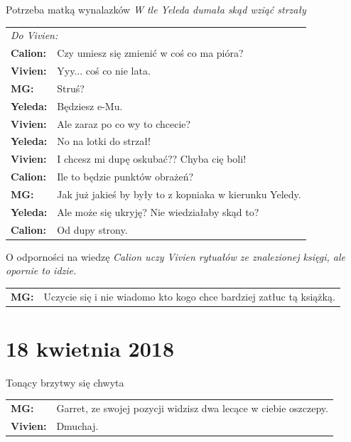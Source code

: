 \documentclass[10pt,twoside,twocolumn]{book}
\begin{document}
\begin{rpg-quotebox}{Potrzeba matką wynalazków}
\textit{W tle Yeleda dumała skąd wziąć strzały}\\

   \begin{tabularx}{\columnwidth}{lX}
   \multicolumn{2}{l}{\textit{Do Vivien:}}\\
      \textbf{Calion:} & Czy umiesz się zmienić  w  coś co ma pióra?\\
      \textbf{Vivien:} & Yyy... coś co nie lata.\\
      \textbf{MG:} & Struś?\\
      \textbf{Yeleda:} & Będziesz e-Mu.\\
      \textbf{Vivien:} & Ale zaraz po co wy to chcecie?\\
      \textbf{Yeleda:} & No na lotki do strzał!\\
      \textbf{Vivien:} & I chcesz mi dupę oskubać?? Chyba cię boli!\\
      \textbf{Calion:} & Ile to będzie punktów obrażeń?\\
      \textbf{MG:} & Jak już jakieś by były to z kopniaka w kierunku Yeledy.\\
      \textbf{Yeleda:} & Ale może się ukryję? Nie wiedziałaby skąd to?\\
      \textbf{Calion:} & Od dupy strony.\\
   \end{tabularx}
\end{rpg-quotebox}

\begin{rpg-quotebox}{O odporności na wiedzę}
   \textit{Calion uczy Vivien rytuałów ze znalezionej księgi, ale opornie to idzie.}\\

   \begin{tabularx}{\columnwidth}{lX}
      \textbf{MG:} & Uczycie się i nie wiadomo kto kogo chce bardziej zatłuc tą książką.\\
   \end{tabularx}
\end{rpg-quotebox}

\section*{18 kwietnia 2018}

\begin{rpg-quotebox}{Tonący brzytwy się chwyta}
   \begin{tabularx}{\columnwidth}{lX}
      \textbf{MG:} & Garret, ze swojej pozycji widzisz dwa lecące w ciebie oszczepy.\\
      \textbf{Vivien:} & Dmuchaj.\\
   \end{tabularx}
\end{rpg-quotebox}
\end{document}
